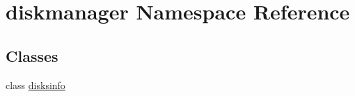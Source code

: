 \hypertarget{namespacediskmanager}{}\section{diskmanager Namespace Reference}
\label{namespacediskmanager}
\subsection*{Classes}
\begin{DoxyCompactItemize}
\item 
class \hyperlink{classdiskmanager_1_1disksinfo}{disksinfo}
\end{DoxyCompactItemize}
